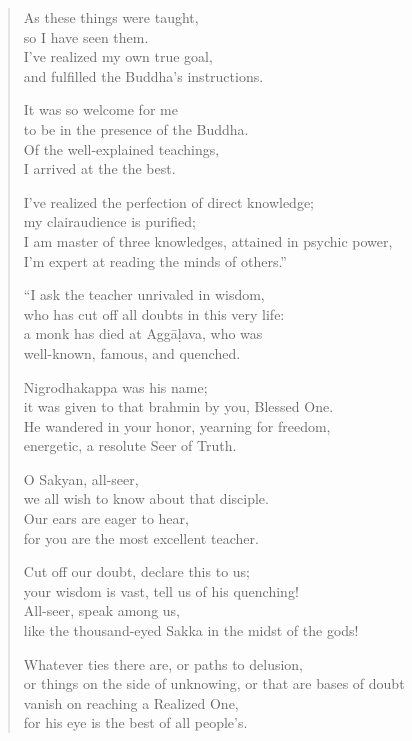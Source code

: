 \documentclass[12pt,openany]{book}%
\begin{document}
\begin{verse}
As these things were taught, \\
so I have seen them. \\
I’ve realized my own true goal, \\
and fulfilled the Buddha’s instructions. 

It was so welcome for me \\
to be in the presence of the Buddha. \\
Of the well-explained teachings, \\
I arrived at the the best. 

I’ve realized the perfection of direct knowledge; \\
my clairaudience is purified; \\
I am master of three knowledges, attained in psychic power, \\
I’m expert at reading the minds of others.” 

“I ask the teacher unrivaled in wisdom, \\
who has cut off all doubts in this very life: \\
a monk has died at \textsanskrit{Aggāḷava}, who was \\
well-known, famous, and quenched. 

Nigrodhakappa was his name; \\
it was given to that brahmin by you, Blessed One. \\
He wandered in your honor, yearning for freedom, \\
energetic, a resolute Seer of Truth. 

O Sakyan, all-seer, \\
we all wish to know about that disciple. \\
Our ears are eager to hear, \\
for you are the most excellent teacher. 

Cut off our doubt, declare this to us; \\
your wisdom is vast, tell us of his quenching! \\
All-seer, speak among us, \\
like the thousand-eyed Sakka in the midst of the gods! 

Whatever ties there are, or paths to delusion, \\
or things on the side of unknowing, or that are bases of doubt \\
vanish on reaching a Realized One, \\
for his eye is the best of all people’s. 


\end{verse}
\end{document}
